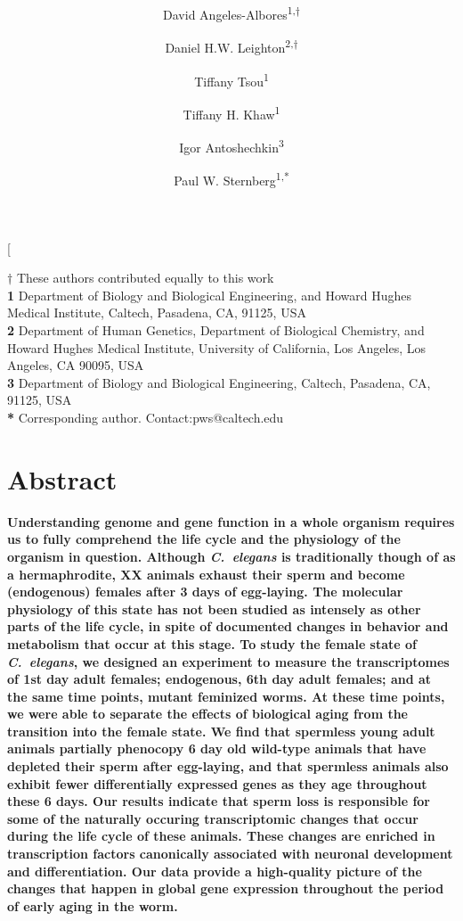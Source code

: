 \documentclass[10pt,letterpaper,twocolumn]{article}
\title{
  \Large
  \textbf{\titleone}
}
\author{David Angeles-Albores\textsuperscript{1,$\dagger{}$}
\and{}
Daniel H.W. Leighton\textsuperscript{2,$\dagger{}$}
\and{}
Tiffany Tsou\textsuperscript{1}
\and{}
Tiffany H. Khaw\textsuperscript{1}
\and{}
Igor Antoshechkin\textsuperscript{3}
\and{}
Paul W. Sternberg\textsuperscript{1,*}
}
\newcommand{\cel}{\emph{C.~elegans}}
\begin{document}
\sloppy{}

\twocolumn[

\maketitle
\textbf{$\dagger$} These authors contributed equally to this work\\
\textbf{1} Department of Biology and Biological Engineering,
and Howard Hughes Medical Institute, Caltech, Pasadena, CA, 91125, USA\\
\textbf{2} Department of Human Genetics, Department of Biological Chemistry,
and Howard Hughes Medical Institute, University of California,
Los Angeles, Los Angeles, CA 90095, USA\\
\textbf{3} Department of Biology and Biological Engineering, Caltech,
Pasadena, CA, 91125, USA\\
\textbf{*} Corresponding author. Contact:pws@caltech.edu

\section*{Abstract}
\bf{}  Understanding genome and gene function in a whole organism requires us to
fully comprehend the life cycle and the physiology of the organism in question.
Although \cel{} is traditionally though of as a hermaphrodite, XX animals exhaust
their sperm and become (endogenous) females after 3 days of egg-laying. The
molecular physiology of this state has not been studied as intensely as other
parts of the life cycle, in spite of documented changes in behavior and
metabolism that occur at this stage. To study the female state of \cel{},
we designed an experiment to measure the transcriptomes of 1st day adult
females; endogenous, 6th day adult females; and at the same time points, mutant
feminized worms. At these time points, we were able to separate the effects of
biological aging from the transition into the female state.
We find that spermless young adult animals partially phenocopy 6 day old
wild-type animals that have depleted their sperm after egg-laying, and that
spermless animals also exhibit fewer differentially expressed genes as they age
throughout these 6 days. Our results indicate that sperm loss is responsible for
some of the naturally occuring transcriptomic changes that occur during the life
cycle of these animals.
These changes are enriched in transcription factors canonically associated with
neuronal development and differentiation. Our data provide a high-quality
picture of the changes that happen in global gene expression throughout the
period of early aging in the worm.\vspace{10mm}
\end{document}
